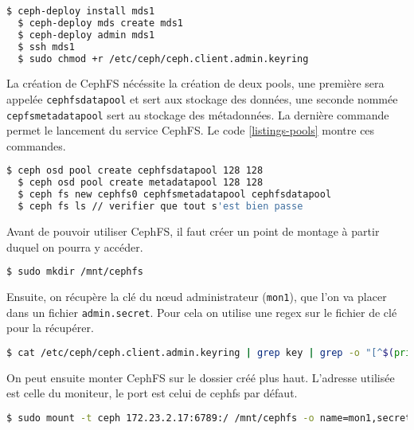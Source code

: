 \vspace{3mm}
\begin{lstlisting}[caption={Installation et mise en place de Ceph pour un MDS}, label={listings-mds},language=bash]
  $ ceph-deploy install mds1
  $ ceph-deploy mds create mds1
  $ ceph-deploy admin mds1
  $ ssh mds1
  $ sudo chmod +r /etc/ceph/ceph.client.admin.keyring
\end{lstlisting}

La création de CephFS nécéssite la création de deux pools, une première sera appelée \verb|cephfsdatapool| et sert aux stockage des données, une seconde nommée \verb|cepfsmetadatapool| sert au stockage des métadonnées. La dernière commande permet le lancement du service CephFS. Le code \ref{listings-pools} montre ces commandes.

\vspace{3mm}
\begin{lstlisting}[caption={Création des pools},label=listings-pools,language=bash]
  $ ceph osd pool create cephfsdatapool 128 128
  $ ceph osd pool create metadatapool 128 128
  $ ceph fs new cephfs0 cephfsmetadatapool cephfsdatapool
  $ ceph fs ls // verifier que tout s'est bien passe
\end{lstlisting}

Avant de pouvoir utiliser CephFS, il faut créer un point de montage à partir duquel on pourra y accéder.
\vspace{3mm}
\begin{lstlisting}[language=bash]
  $ sudo mkdir /mnt/cephfs
\end{lstlisting}

Ensuite, on récupère la clé du nœud administrateur (\verb|mon1|), que l'on va placer dans un fichier \verb|admin.secret|. Pour cela on utilise une regex sur le fichier de clé pour la récupérer.
\vspace{3mm}
\begin{lstlisting}[language=bash]
  $ cat /etc/ceph/ceph.client.admin.keyring | grep key | grep -o "[^$(printf '\t key = ')].*" > ~/ceph-cluster/admin.secret
\end{lstlisting}

On peut ensuite monter CephFS sur le dossier créé plus haut. L'adresse utilisée est celle du moniteur, le port est celui de cephfs par défaut.
\vspace{3mm}
\begin{lstlisting}[language=bash]
  $ sudo mount -t ceph 172.23.2.17:6789:/ /mnt/cephfs -o name=mon1,secretfile=~/ceph-cluster/admin.secret
\end{lstlisting}

